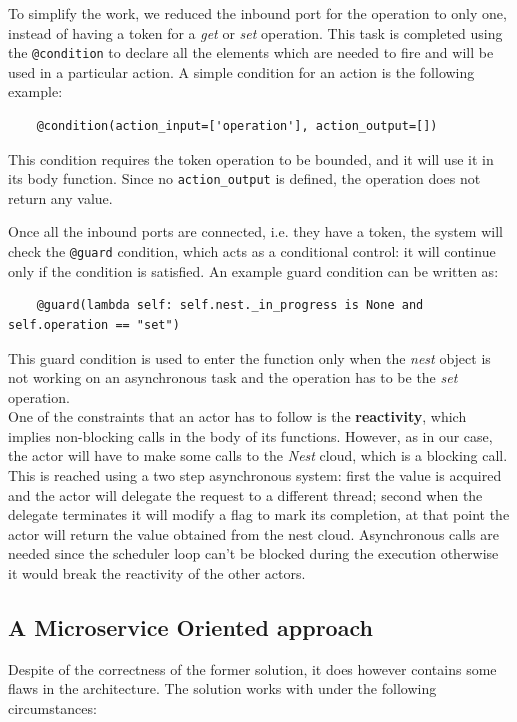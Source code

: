 To simplify the work, we reduced the inbound port for the operation to only one, instead of having a token
for a \textit{get} or \textit{set} operation. This task is completed using the \texttt{@condition} to declare
all the elements which are needed to fire and will be used in a particular action.
A simple condition for an action is the following example:
\begin{verbatim}
    @condition(action_input=['operation'], action_output=[])
\end{verbatim}
This condition requires the token operation to be bounded, and it will use it in its body function. Since
no \texttt{action\_output} is defined, the operation does not return any value.

Once all the inbound ports are connected, i.e. they have a token, the system will check the \texttt{@guard} condition,
which acts as a conditional control: it will continue only if the condition is satisfied.
An example guard condition can be written as:

\begin{verbatim}
    @guard(lambda self: self.nest._in_progress is None and self.operation == "set")
\end{verbatim}
This guard condition is used to enter the function only when the \textit{nest} object is not
working on an asynchronous task and the operation has to be the \textit{set} operation.\\
One of the constraints that an actor has to follow is the \textbf{reactivity}, which implies
non-blocking calls in the body of its functions. However, as in our case, the actor will have to
make some calls to the \textit{Nest} cloud, which is a blocking call. This is reached
using a two step asynchronous system: first the value is acquired and the actor
will delegate the request to a different thread; second when the delegate terminates it will
modify a flag to mark its completion, at that point the actor will return the value obtained
from the nest cloud. Asynchronous calls are needed since the scheduler loop can't be blocked
during the execution otherwise it would break the reactivity of the other actors.

\subsection{A Microservice Oriented approach}

Despite of the correctness of the former solution, it does however contains some
flaws in the architecture. The solution works with under the following circumstances:

